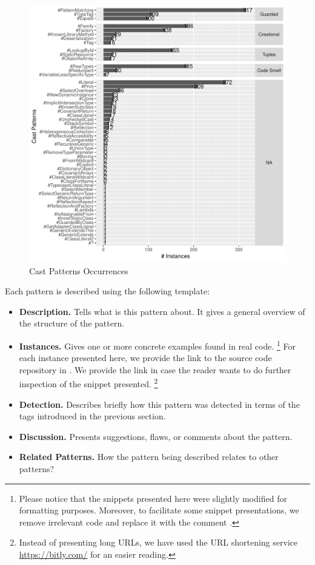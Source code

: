 \begin{figure}[ht!]
\centering
\includegraphics[width=\columnwidth]{analysis/table-patterns-5000.pdf}
\caption{Cast Patterns Occurrences} \label{fig:patterns}
\end{figure}

Each pattern is described using the following template:

\begin{itemize}
\item \textbf{Description.}
Tells what is this pattern about.
It gives a general overview of the structure of the pattern.
\item \textbf{Instances.}
Gives one or more concrete examples found in real code.%
\footnote{Please notice that the snippets presented here were slightly
modified for formatting purposes.
Moreover, to facilitate some snippet presentations,
we remove irrelevant code and replace it with the
comment \code{// [...]}.}
For each instance presented here,
we provide the link to the source code repository in \lgtm{}.
We provide the link in case the reader wants to do further inspection
of the snippet presented.%
\footnote{Instead of presenting \lgtm{} long URLs,
we have used the URL shortening service \url{https://bitly.com/}
for an easier reading.
}
\item \textbf{Detection.}
Describes briefly how this pattern was detected in terms of the tags
introduced in the previous section.
\item \textbf{Discussion.}
Presents suggestions, flaws, or comments about the pattern.
\item \textbf{Related Patterns.}
How the pattern being described relates to other patterns?
\end{itemize}


